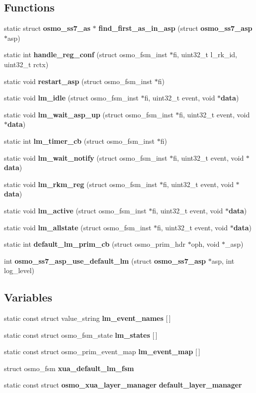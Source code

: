 \subsection*{Functions}
\begin{DoxyCompactItemize}
\item 
static struct {\bf osmo\+\_\+ss7\+\_\+as} $\ast$ {\bf find\+\_\+first\+\_\+as\+\_\+in\+\_\+asp} (struct {\bf osmo\+\_\+ss7\+\_\+asp} $\ast$asp)
\item 
static int {\bf handle\+\_\+reg\+\_\+conf} (struct osmo\+\_\+fsm\+\_\+inst $\ast$fi, uint32\+\_\+t l\+\_\+rk\+\_\+id, uint32\+\_\+t rctx)
\item 
static void {\bf restart\+\_\+asp} (struct osmo\+\_\+fsm\+\_\+inst $\ast$fi)
\item 
static void {\bf lm\+\_\+idle} (struct osmo\+\_\+fsm\+\_\+inst $\ast$fi, uint32\+\_\+t event, void $\ast${\bf data})
\item 
static void {\bf lm\+\_\+wait\+\_\+asp\+\_\+up} (struct osmo\+\_\+fsm\+\_\+inst $\ast$fi, uint32\+\_\+t event, void $\ast${\bf data})
\item 
static int {\bf lm\+\_\+timer\+\_\+cb} (struct osmo\+\_\+fsm\+\_\+inst $\ast$fi)
\item 
static void {\bf lm\+\_\+wait\+\_\+notify} (struct osmo\+\_\+fsm\+\_\+inst $\ast$fi, uint32\+\_\+t event, void $\ast${\bf data})
\item 
static void {\bf lm\+\_\+rkm\+\_\+reg} (struct osmo\+\_\+fsm\+\_\+inst $\ast$fi, uint32\+\_\+t event, void $\ast${\bf data})
\item 
static void {\bf lm\+\_\+active} (struct osmo\+\_\+fsm\+\_\+inst $\ast$fi, uint32\+\_\+t event, void $\ast${\bf data})
\item 
static void {\bf lm\+\_\+allstate} (struct osmo\+\_\+fsm\+\_\+inst $\ast$fi, uint32\+\_\+t event, void $\ast${\bf data})
\item 
static int {\bf default\+\_\+lm\+\_\+prim\+\_\+cb} (struct osmo\+\_\+prim\+\_\+hdr $\ast$oph, void $\ast$\+\_\+asp)
\item 
int {\bf osmo\+\_\+ss7\+\_\+asp\+\_\+use\+\_\+default\+\_\+lm} (struct {\bf osmo\+\_\+ss7\+\_\+asp} $\ast$asp, int log\+\_\+level)
\end{DoxyCompactItemize}
\subsection*{Variables}
\begin{DoxyCompactItemize}
\item 
static const struct value\+\_\+string {\bf lm\+\_\+event\+\_\+names} [$\,$]
\item 
static const struct osmo\+\_\+fsm\+\_\+state {\bf lm\+\_\+states} [$\,$]
\item 
static const struct osmo\+\_\+prim\+\_\+event\+\_\+map {\bf lm\+\_\+event\+\_\+map} [$\,$]
\item 
struct osmo\+\_\+fsm {\bf xua\+\_\+default\+\_\+lm\+\_\+fsm}
\item 
static const struct {\bf osmo\+\_\+xua\+\_\+layer\+\_\+manager} {\bf default\+\_\+layer\+\_\+manager}
\end{DoxyCompactItemize}


